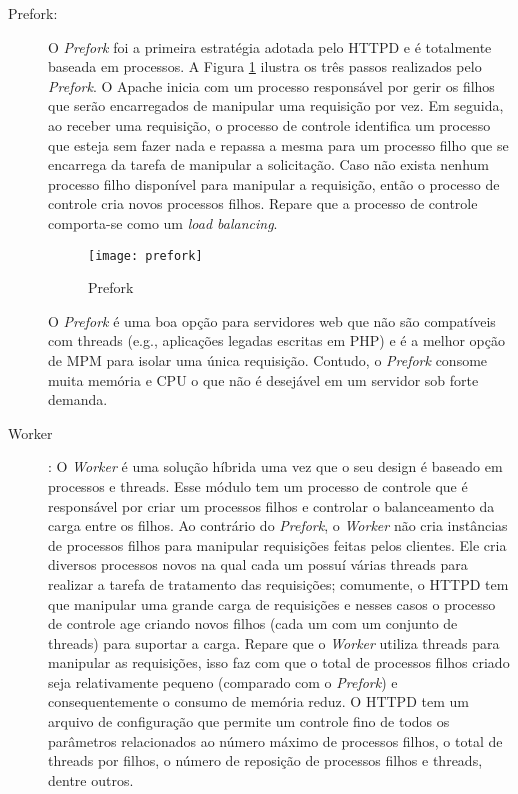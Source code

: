 \begin{description}

	\item[Prefork:]

O \textit{Prefork} foi a primeira estratégia adotada pelo HTTPD e é totalmente
baseada em processos. A Figura \ref{fig:prefork} ilustra os três passos
realizados pelo \textit{Prefork}. O Apache inicia com um processo responsável
por gerir os filhos que serão encarregados de manipular uma requisição por vez.
Em seguida, ao receber uma requisição, o processo de controle identifica um
processo que esteja sem fazer nada e repassa a mesma para um processo filho que
se encarrega da tarefa de manipular a solicitação. Caso não exista nenhum
processo filho disponível para manipular a requisição, então o processo de
controle cria novos processos filhos. Repare que a processo de controle
comporta-se como um \textit{load balancing}.

\begin{figure}[!h]
  \centering
  \texttt{[image: prefork]} 
  \caption{Prefork}
  \label{fig:prefork} 
\end{figure}

O \textit{Prefork} é uma boa opção para servidores web que não são compatíveis
com threads (e.g., aplicações legadas escritas em PHP) e é a melhor opção de MPM
para isolar uma única requisição. Contudo, o \textit{Prefork} consome muita
memória e CPU o que não é desejável em um servidor sob forte demanda.

	\item [Worker]: O \textit{Worker} é uma solução híbrida uma vez que o seu design é baseado em
processos e threads. Esse módulo tem um processo de controle que é responsável
por criar um processos filhos e controlar o balanceamento da carga entre os
filhos. Ao contrário do \textit{Prefork}, o \textit{Worker} não cria instâncias
de processos filhos para manipular requisições feitas pelos clientes. Ele cria
diversos processos novos na qual cada um possuí várias threads para realizar a
tarefa de tratamento das requisições; comumente, o HTTPD tem que manipular uma
grande carga de requisições e nesses casos o processo de controle age criando
novos filhos (cada um com um conjunto de threads) para suportar a carga.
Repare que o \textit{Worker} utiliza threads para manipular as requisições,
isso faz com que o total de processos filhos criado seja relativamente pequeno
(comparado com o \textit{Prefork}) e consequentemente o consumo de memória
reduz. O HTTPD tem um arquivo de configuração que permite um controle fino de
todos os parâmetros relacionados ao número máximo de processos filhos, o total
de threads por filhos, o número de reposição de processos filhos e threads,
dentre outros.


\end{description}
